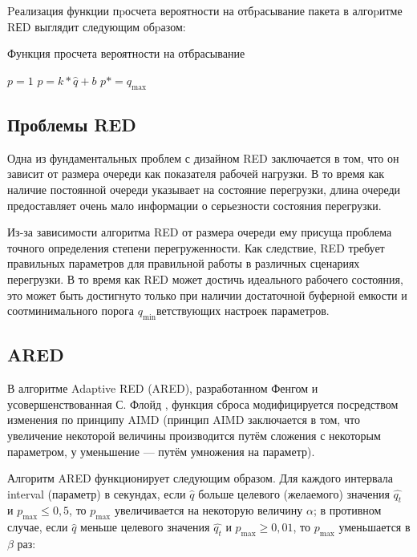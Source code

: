 Pеализация функции пpосчета вероятности на отбpасывание пакета в алгоpитме RЕD
выглядит следующим обpазом:

\begin{algorithm}[H]
	\caption{Функция просчета вероятности на отбрасывание} 
	\begin{algorithmic}[1]
                \State $p = 1$
            \Else 
              \State $p = k * \hat{q} + b$
              \State $p *= q_{\max}$
            \EndIf
	\end{algorithmic} 
\end{algorithm}

\subsection{Проблемы RED}
\label{chap1:sec3:sub3}

Одна из фундаментальных проблем с дизайном RED заключается в том, что он
зависит от размера очереди как показателя рабочей нагрузки. В то время как
наличие постоянной очереди указывает на состояние перегрузки, длина очереди
предоставляет очень мало информации о серьезности состояния перегрузки. 

Из-за зависимости алгоритма RED от размера очереди ему присуща проблема точного
определения степени перегруженности. Как следствие, RED требует
правильных параметров для правильной работы в различных
сценариях перегрузки. В то время как RED может достичь идеального рабочего
состояния, это может быть достигнуто только при наличии достаточной буферной
емкости и соотминимального порога $q_{\min}$ветствующих настроек параметров.


\subsection{ARED}
\label{chap1:sec3:sub4}

В алгоритме Adaptive RED (ARED), разработанном Фенгом
\cite{ARED_1,ARED_2} и усовершенствованная С. Флойд \cite{ARED_3},
функция сброса модифицируется посредством изменения по принципу AIMD
(принцип AIMD заключается в том, что увеличение некоторой величины
производится путём сложения с некоторым параметром, у уменьшение ---
путём умножения на параметр).

Алгоритм ARED функционирует следующим образом. Для каждого интервала
interval (параметр) в секундах, если $\hat{q}$ больше целевого
(желаемого) значения $\hat{q_t}$ и $p_{\max} \leqslant 0,5$, то $p_{\max}$
увеличивается на некоторую величину $\alpha$; в противном случае, если
$\hat{q}$ меньше целевого значения $\hat{q_t}$ и $p_{\max}\geqslant 0,01$, то
$p_{\max}$ уменьшается в $\beta$ раз:

